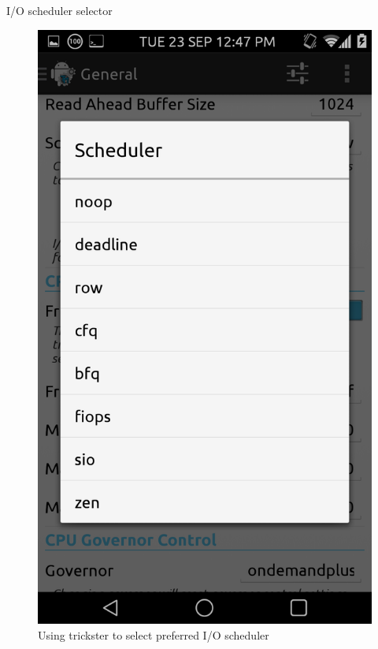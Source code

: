 \documentclass{beamer}
\begin{document}
  
    \begin{frame}{I/O scheduler selector}
   \begin{figure}
   \includegraphics[scale=.1]{scheduler} 
   \caption {\tiny{Using trickster to select preferred I/O scheduler}}
   \end{figure}
     
    \end{frame}
\end{document}
